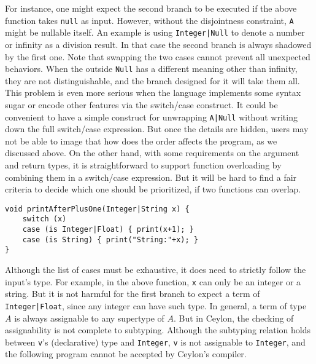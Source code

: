 For instance, one might expect the second branch to be executed if the above
function takes \lstinline{null} as input.
However, without the disjointness constraint, \lstinline{A} might be nullable itself.
An example is using \lstinline{Integer|Null} to denote a number or infinity
as a division result.
In that case the second branch is always shadowed by the first one.
Note that swapping the two cases cannot prevent all unexpected behaviors.
When the outside \lstinline{Null} has a different meaning other than infinity,
they are not distinguishable, and the branch designed for it will take them all.
This problem is even more serious when the language implements some syntax
sugar or encode other features via the switch/case construct.
It could be convenient to have a simple construct for unwrapping \lstinline{A|Null} without writing down the full switch/case expression.
But once the details are hidden, users may not be able to image that how does
the order affects the program, as we discussed above.  
On the other hand, with some requirements on the argument and return types, it is 
straightforward to support function overloading by combining them in a switch/case expression.
But it will be hard to find a fair criteria to decide which one
should be prioritized, if two functions can overlap.

\begin{lstlisting}
void printAfterPlusOne(Integer|String x) {
	switch (x)
	case (is Integer|Float) { print(x+1); }
	case (is String) { print("String:"+x); }
}
\end{lstlisting}

Although the list of cases must be exhaustive, it does need to
strictly follow the input's type.
For example, in the above function, \lstinline{x} can only be an integer
or a string. But it is not harmful for the first branch to expect
a term of \lstinline{Integer|Float}, since any integer can have such
type.
In general, a term of type $A$ is always assignable to any supertype of $A$.
But in Ceylon, the checking of assignability is not complete to
subtyping.
Although the subtyping relation holds between \lstinline{v}'s
(declarative) type and \lstinline{Integer}, \lstinline{v}
is not assignable to \lstinline{Integer}, and the following program
cannot be accepted by Ceylon's compiler.

